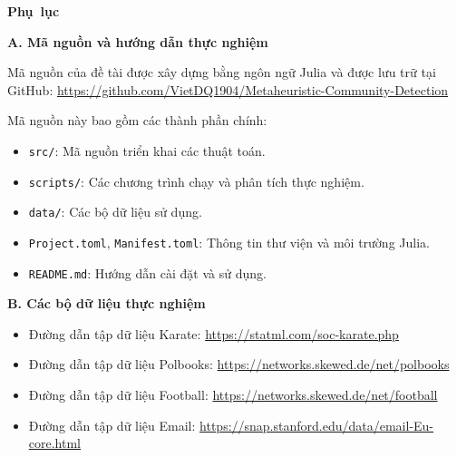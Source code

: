 \documentclass[14pt,a4paper]{extarticle}
\begin{document}
\newpage
\renewcommand{\refname}{\mbox{Danh mục tài liệu tham khảo}}



\newpage
\noindent \mbox{\textbf{\fontsize{20}{24}\selectfont Phụ lục}}

\noindent {}

\noindent \textbf{A. Mã nguồn và hướng dẫn thực nghiệm}

Mã nguồn của đề tài được xây dựng bằng ngôn ngữ Julia và
được lưu trữ tại GitHub:
\url{https://github.com/VietDQ1904/Metaheuristic-Community-Detection}

Mã nguồn này bao gồm các thành phần chính:

\begin{itemize}
    \item \texttt{src/}: Mã nguồn triển khai các thuật toán. 
    \item \texttt{scripts/}: Các chương trình chạy và phân tích thực nghiệm.
    \item \texttt{data/}: Các bộ dữ liệu sử dụng. 
    \item \texttt{Project.toml}, \texttt{Manifest.toml}:
    Thông tin thư viện và môi trường Julia.
    \item \texttt{README.md}: Hướng dẫn cài đặt và sử dụng.
\end{itemize}

\noindent \textbf{B. Các bộ dữ liệu thực nghiệm}

\begin{itemize}
    \item Đường dẫn tập dữ liệu Karate: \url{https://statml.com/soc-karate.php}
    \item Đường dẫn tập dữ liệu Polbooks: \url{https://networks.skewed.de/net/polbooks}
    \item Đường dẫn tập dữ liệu Football: \url{https://networks.skewed.de/net/football}
    \item Đường dẫn tập dữ liệu Email: \url{https://snap.stanford.edu/data/email-Eu-core.html}
\end{itemize}
\end{document}
